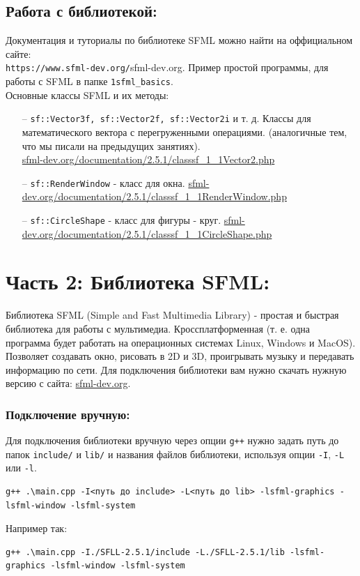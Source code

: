\documentclass{article}
\begin{document}
\subsection*{Работа с библиотекой:}
Документация и туториалы по библиотеке SFML можно найти на оффициальном сайте:\\ \texttt{https://www.sfml-dev.org/}{sfml-dev.org}. Пример простой программы, для работы с SFML в папке \texttt{1sfml\_basics}. \\
Основные классы SFML и их методы:
\begin{itemize}
\item[--] \texttt{sf::Vector3f, sf::Vector2f, sf::Vector2i} и т. д. Классы для математического вектора с перегруженными операциями. (аналогичные тем, что мы писали на предыдущих занятиях). \\
\href{https://www.sfml-dev.org/documentation/2.5.1/classsf_1_1Vector2.php}{sfml-dev.org/documentation/2.5.1/classsf\_1\_1Vector2.php}
\item[--] \texttt{sf::RenderWindow} - класс для окна.
\href{https://www.sfml-dev.org/documentation/2.5.1/classsf_1_1RenderWindow.php}{sfml-dev.org/documentation/2.5.1/classsf\_1\_1RenderWindow.php}
\item[--] \texttt{sf::CircleShape} - класс для фигуры - круг.
\href{https://www.sfml-dev.org/documentation/2.5.1/classsf_1_1CircleShape.php}{sfml-dev.org/documentation/2.5.1/classsf\_1\_1CircleShape.php}
\end{itemize}


\newpage
\section*{Часть 2: Библиотека SFML:}
Библиотека SFML (Simple and Fast Multimedia Library) - простая и быстрая библиотека для работы с мультимедиа. Кроссплатформенная (т. е. одна программа будет работать на операционных системах Linux, Windows и MacOS). Позволяет создавать окно, рисовать в 2D и 3D, проигрывать музыку и передавать информацию по сети. Для подключения библиотеки вам нужно скачать нужную версию с сайта: \href{https://www.sfml-dev.org/}{sfml-dev.org}.

\subsubsection*{Подключение вручную:}
Для подключения библиотеки вручную через опции \texttt{g++} нужно задать путь до папок \texttt{include/} и \texttt{lib/} и названия файлов библиотеки, используя опции \texttt{-I}, \texttt{-L} или \texttt{-l}. 
\begin{verbatim}
g++ .\main.cpp -I<путь до include> -L<путь до lib> -lsfml-graphics -lsfml-window -lsfml-system
\end{verbatim}
Например так:
\begin{verbatim}
g++ .\main.cpp -I./SFLL-2.5.1/include -L./SFLL-2.5.1/lib -lsfml-graphics -lsfml-window -lsfml-system
\end{verbatim}
\end{document}
